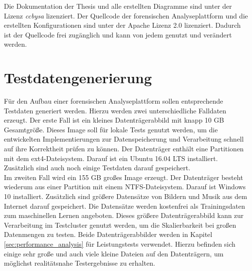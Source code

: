\noindent
Die Dokumentation der Thesis und alle erstellten Diagramme sind unter der Lizenz \textit{\gls{ccbysa}} lizenziert. Der Quellcode der forensischen Analyseplattform und die erstellten Konfigurationen sind unter der Apache Lizenz 2.0 lizenziert. Dadurch ist der Quellcode frei zugänglich und kann von jedem genutzt und verändert werden.\\

\section{Testdatengenerierung}
\label{testdatacreation}
Für den Aufbau einer forensischen Analyseplattform sollen entsprechende Testdaten generiert werden. Hierzu werden zwei unterschiedliche Falldaten erzeugt. Der erste Fall ist ein kleines Datenträgerabbild mit knapp 10 GB Gesamtgröße. Dieses Image soll für lokale Tests genutzt werden, um die entwickelten Implementierungen zur Datenspeicherung und Verarbeitung schnell auf ihre Korrektheit prüfen zu können. Der Datenträger enthält eine Partitionen mit dem ext4-Dateisystem. Darauf ist ein Ubuntu 16.04 LTS installiert. Zusätzlich sind auch noch einige Testdaten darauf gespeichert.\\

\noindent
Im zweiten Fall wird ein 155 GB großes Image erzeugt. Der Datenträger besteht wiederum aus einer Partition mit einem NTFS-Dateisystem. Darauf ist Windows 10 installiert. Zusätzlich sind größere Datensätze von Bildern und Musik aus dem Internet darauf gespeichert. Die Datensätze werden kostenfrei als Trainingsdaten zum maschinellen Lernen angeboten. Dieses größere Datenträgerabbild kann zur Verarbeitung im Testcluster genutzt werden, um die Skalierbarkeit bei großen Datenmengen zu testen. Beide Datenträgerabbilder werden in Kapitel \ref{sec:performance_analysis} für Leistungstests verwendet. Hierzu befinden sich einige sehr große und auch viele kleine Dateien auf den Datenträgern, um möglichst realitätsnahe Testergebnisse zu erhalten.